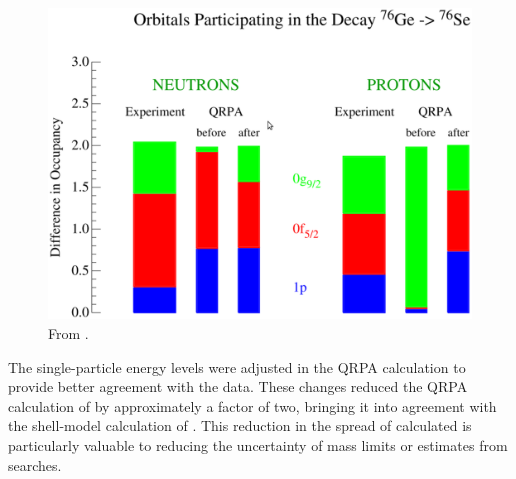 \begin{figure}[htp]
\centering
\includegraphics[width=1.0\textwidth]{figures/occupancyDiffs.eps}
\caption{From \cite{schiffer_review}.}
\label{fig:occupancyDiffs}
\end{figure}
The single-particle energy levels were adjusted in the QRPA calculation \cite{SuhonenEnergyAdjust} to provide better agreement with the data.  These changes reduced the QRPA calculation of \NME by approximately a factor of two, bringing it into agreement with the shell-model calculation of \NME.  This reduction in the spread of calculated \NME is particularly valuable to reducing the uncertainty of mass limits or estimates from \zvbb searches. 

